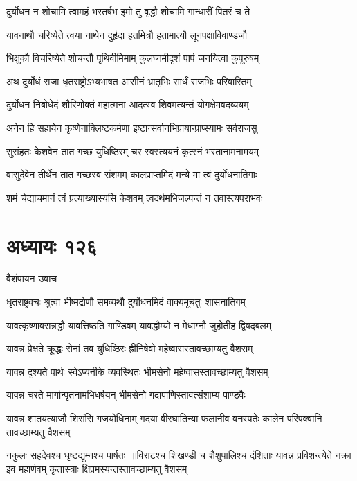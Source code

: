 \twolineshloka
{दुर्योधन न शोचामि त्वामहं भरतर्षभ}
{इमो तु वृद्धौ शोचामि गान्धारीं पितरं च ते}


\twolineshloka
{यावनाथौ चरिष्येते त्वया नाथेन दुर्हृदा}
{हतमित्रौ हतामात्यौ लूनपक्षाविवाण्डजौ}


\twolineshloka
{भिक्षुकौ विचरिष्येते शोचन्तौ पृथिवीमिमाम्}
{कुलघ्नमीदृशं पापं जनयित्वा कुपूरुषम्}


\twolineshloka
{अथ दुर्योधं राजा धृतराष्ट्रोऽभ्यभाषत}
{आसीनं भ्रातृभिः सार्धं राजभिः परिवारितम्}


\twolineshloka
{दुर्योधन निबोधेदं शौरिणोक्तं महात्मना}
{आदत्स्व शिवमत्यन्तं योगक्षेमवदव्ययम्}


\twolineshloka
{अनेन हि सहायेन कृष्णेनाक्लिष्टकर्मणा}
{इष्टान्सर्वानभिप्रायान्प्राप्स्यामः सर्वराजसु}


\twolineshloka
{सुसंहतः केशवेन तात गच्छ युधिष्ठिरम्}
{चर स्वस्त्ययनं कृत्स्नं भरतानामनामयम्}


\twolineshloka
{वासुदेवेन तीर्थेन तात गच्छस्व संशमम्}
{कालप्राप्तमिदं मन्ये मा त्वं दुर्योधनातिगाः}


\twolineshloka
{शमं चेद्याचमानं त्वं प्रत्याख्यास्यसि केशवम्}
{त्वदर्थमभिजल्पन्तं न तवास्त्यपराभवः}


\chapter{अध्यायः १२६}
\twolineshloka
{वैशंपायन उवाच}
{}


\twolineshloka
{धृतराष्ट्रवचः श्रुत्वा भीष्मद्रोणौ समव्यथौ}
{दुर्योधनमिदं वाक्यमूचतुः शासनातिगम्}


\twolineshloka
{यावत्कृष्णावसन्नद्धौ यावत्तिष्ठति गाण्डिवम्}
{यावद्धौम्यो न मेधाग्नौ जुहोतीह द्विषद्बलम्}


\twolineshloka
{यावन्न प्रेक्षते क्रूद्धः सेनां तव युधिष्ठिरः}
{ह्रीनिषेवो महेष्वासस्तावच्छाम्यतु वैशसम्}


\twolineshloka
{यावन्न दृश्यते पार्थः स्वेऽप्यनीके व्यवस्थितः}
{भीमसेनो महेष्वासस्तावच्छाम्यतु वैशसम्}


\twolineshloka
{यावन्न चरते मार्गान्पृतनामभिधर्षयन्}
{भीमसेनो गदापाणिस्तावत्संशाम्य पाण्डवैः}


\threelineshloka
{यावन्न शातयत्याजौ शिरांसि गजयोधिनाम्}
{गदया वीरघातिन्या फलानीव वनस्पतेः}
{कालेन परिपक्वानि तावच्छाम्यतु वैशसम्}


नकुलः सहदेवश्च धृष्टद्युम्नश्च पार्षतः ॥विराटश्च शिखण्डी च शैशुपालिश्च दंशिताः
\twolineshloka
{यावन्न प्रविशन्त्येते नक्रा इव महार्णवम्}
{कृतास्त्राः क्षिप्रमस्यन्तस्तावच्छाम्यतु वैशसम्}


